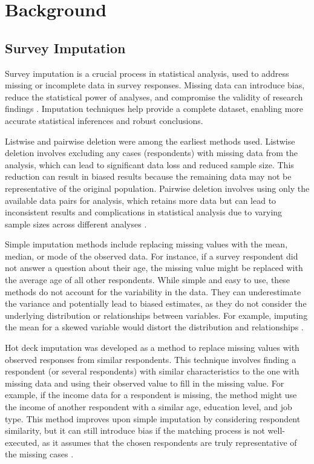 \section{Background}

\subsection{Survey Imputation}
Survey imputation is a crucial process in statistical analysis, used to address missing or incomplete data in survey responses. Missing data can introduce bias, reduce the statistical power of analyses, and compromise the validity of research findings \cite{little2019statistical, Rubin1989MultipleIF, Schafer1999MultipleIA}. Imputation techniques help provide a complete dataset, enabling more accurate statistical inferences and robust conclusions.

Listwise and pairwise deletion were among the earliest methods used. Listwise deletion involves excluding any cases (respondents) with missing data from the analysis, which can lead to significant data loss and reduced sample size. This reduction can result in biased results because the remaining data may not be representative of the original population. Pairwise deletion involves using only the available data pairs for analysis, which retains more data but can lead to inconsistent results and complications in statistical analysis due to varying sample sizes across different analyses \cite{little2019statistical}.

Simple imputation methods include replacing missing values with the mean, median, or mode of the observed data. For instance, if a survey respondent did not answer a question about their age, the missing value might be replaced with the average age of all other respondents. While simple and easy to use, these methods do not account for the variability in the data. They can underestimate the variance and potentially lead to biased estimates, as they do not consider the underlying distribution or relationships between variables. For example, imputing the mean for a skewed variable would distort the distribution and relationships \cite{little2019statistical}.

Hot deck imputation was developed as a method to replace missing values with observed responses from similar respondents. This technique involves finding a respondent (or several respondents) with similar characteristics to the one with missing data and using their observed value to fill in the missing value. For example, if the income data for a respondent is missing, the method might use the income of another respondent with a similar age, education level, and job type. This method improves upon simple imputation by considering respondent similarity, but it can still introduce bias if the matching process is not well-executed, as it assumes that the chosen respondents are truly representative of the missing cases \cite{andridge2010review}.

